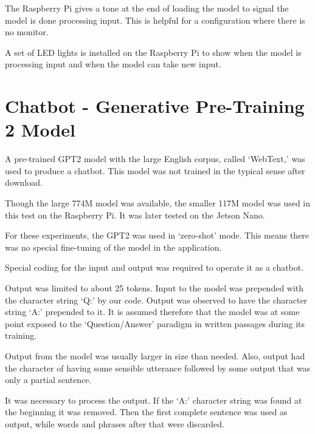 The Raspberry Pi gives a tone at the end of loading the model to signal the model is done processing input. %
This is helpful for a configuration where there is no monitor.

A set of LED lights is installed on the Raspberry Pi to show when the model is processing input and when the model can take new input. %


\section{Chatbot - Generative Pre-Training 2 Model}

\label{install-gpt2-chatbot}
A pre-trained GPT2 model with the large English corpus, called `WebText,' was used to produce a chatbot.%
This model was not trained in the typical sense after download. 

Though the large 774M model was available, the smaller 117M model was used in this test on the Raspberry Pi. It was later tested on the Jetson Nano.

For these experiments, the GPT2 was used in `zero-shot' mode. This means there was no special fine-tuning of the model in the application.

Special coding for the input and output was required to operate it as a chatbot. 

Output was limited to about 25 tokens. Input to the model was prepended with the character string `Q:' by our code. Output was observed to have the character string `A:' prepended to it. It is assumed therefore that the model was at some point exposed to the `Question/Answer' paradigm in written passages during its training. %

Output from the model was usually larger in size than needed. Also, output had the character of having some sensible utterance followed by some output that was only a partial sentence.

It was necessary to process the output. 
If the `A:' character string was found at the beginning it was removed.
Then the first complete sentence was used as output, while words and phrases after that were discarded.


